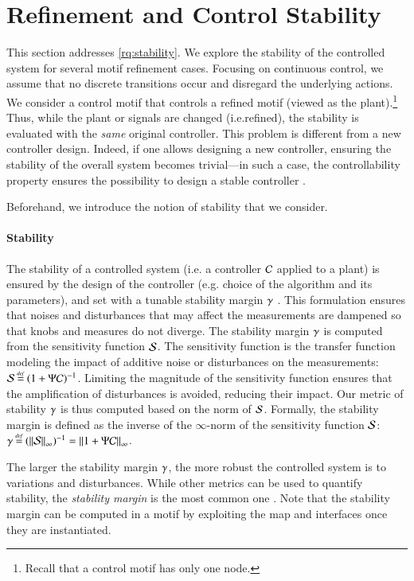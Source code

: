 \documentclass[runningheads]{llncs}
\makeatletter
\newcommand{\mdash}[1][]{{#1}---{#1}}
\newcommand{\ie}[1][\@ ]{i.e.{#1}}
\newcommand{\bydef}{\mathbin{\stackrel{\scriptscriptstyle\mathit{def}}{=}}}
\newcommand{\plant}[1][]{\Psi\ifx#1\relax\else^{#1}\fi}
\newcommand{\controller}[1][]{\mathcal{C}\ifx#1\relax\else^{#1}\fi}
\newcommand{\margin}[1][]{\gamma\ifx#1\relax\else^{#1}\fi}
\newcommand{\sensitivity}[1][]{\mathcal{S}\ifx#1\relax\else^{#1}\fi}
\makeatother
\begin{document}
\section{Refinement and Control Stability}
\label{secn:Ctrl-Stability}
This section addresses \ref{rq:stability}. We explore the stability of the controlled system for several motif refinement cases.  Focusing on continuous control, we assume that no discrete transitions occur and disregard the underlying actions.
%
We consider a control motif that controls a refined motif (viewed as the plant).\footnote{%
%
    Recall that a control motif has only one node.
%
} Thus, while the plant or signals are changed (\ie refined), the stability is evaluated with the \emph{same} original controller. This problem is different from a new controller design. Indeed, if one allows designing a new controller, ensuring the stability of the overall system becomes trivial\mdash in such a case, the controllability property ensures the possibility to design a stable controller \cite{filieri2015software,zhou1998essentials}.


Beforehand, we introduce the notion of stability that we consider. 
\paragraph{Stability}
The stability of a controlled system (i.e. a controller $\controller$ applied to a plant) is ensured by the design of the controller (e.g. choice of the algorithm and its parameters), and set with a tunable stability margin $\margin$ \cite{astrom1995pid,aastrom2000model,zhou1998essentials}. 
This formulation ensures that noises and disturbances that may affect the measurements are dampened so that knobs and measures do not diverge. 
The stability margin $\margin$ is computed from the sensitivity function $\sensitivity$. The sensitivity function is the transfer function modeling the impact of additive noise or disturbances on the measurements:
$\sensitivity \bydef (1+\plant\controller)^{-1}$.
Limiting the magnitude of the sensitivity function ensures that  the amplification of disturbances is avoided, reducing their impact. Our metric of stability $\margin$ is thus computed based on the norm of $\sensitivity$.
%
Formally, the stability margin is defined as the inverse of the $\infty$-norm of the sensitivity function $\sensitivity$:
$\margin \bydef (\left\lVert \sensitivity \right\rVert_\infty)^{-1} = \left\lVert 1+ \plant \controller \right\rVert_\infty$.

The larger the stability margin $\margin$, the more robust the controlled system is to variations and disturbances.
While other metrics can be used to quantify stability, the {\em stability margin} is the most common one \cite{doyle2013feedback}.
Note that the stability margin can be computed in a motif by exploiting the map and interfaces once they are instantiated.
\end{document}
